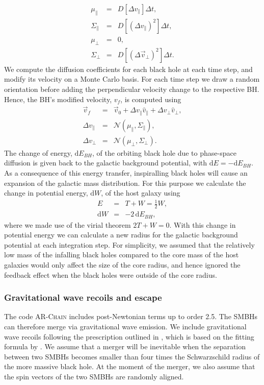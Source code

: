 \documentclass[fleqn,usenatbib,useAMS]{mnras}
\begin{document}
\begin{eqnarray}
\mu_\parallel &=& D[\Delta v_\parallel]\Delta t,\\
\Sigma_\parallel &=& D[(\Delta v_\parallel)^2]\Delta t,\\
\mu_\bot &=& 0,\\
\Sigma_\bot &=& D[(\Delta \vec{v}_\bot)^2]\Delta t.
\end{eqnarray}
We compute the diffusion coefficients for each black hole at each time step, and modify its velocity on a Monte Carlo basis. For each time step we draw a random orientation before adding the perpendicular velocity change to the respective BH. Hence, the BH's modified velocity, $v_f$, is computed using
\begin{eqnarray}
\vec{v}_f &=& \vec{v}_0 + \Delta v_\parallel \hat{v}_\parallel + \Delta v_\bot \hat{v}_\bot,\\
\Delta v_\parallel &=& \mathcal{N}(\mu_\parallel, \Sigma_\parallel),\\
\Delta v_\bot &=& \mathcal{N}(\mu_\bot, \Sigma_\bot).
\end{eqnarray}
The change of energy, $\mbox{d}E_{BH}$, of the orbiting black hole due to phase-space diffusion is given back to the galactic background potential, with $\mbox{d}E = -\mbox{d}E_{BH}$. As a consequence of this energy transfer, inspiralling black holes will cause an expansion of the galactic mass distribution. For this purpose we calculate the change in potential energy, $\mbox{d}W$, of the host galaxy using
\begin{eqnarray}
E &=& T + W = \frac{1}{2}W,\\
\mbox{d}W &=& -2\,\mbox{d}E_{BH},
\end{eqnarray}
where we made use of the virial theorem $2T+W =0$. With this change in potential energy we can calculate a new radius for the galactic background potential at each integration step. For simplicity, we assumed that the relatively low mass of the infalling black holes compared to the core mass of the host galaxies would only affect the size of the core radius, and hence ignored the feedback effect when the black holes were outside of the core radius.

\subsubsection{Gravitational wave recoils and escape}
The code \textsc{AR-Chain} includes post-Newtonian terms up to order 2.5. The SMBHs can therefore merge via gravitational wave emission. We include gravitational wave recoils following the prescription outlined in \citet{2015ApJ...799..178K}, which is based on the fitting formula by \citet{2012PhRvD..85h4015L}.  We assume that a merger will be inevitable when the separation between two SMBHs becomes smaller than four times the Schwarzschild radius of the more massive black hole. At the moment of the merger, we also assume that the spin vectors of the two SMBHs are randomly aligned.
\end{document}
